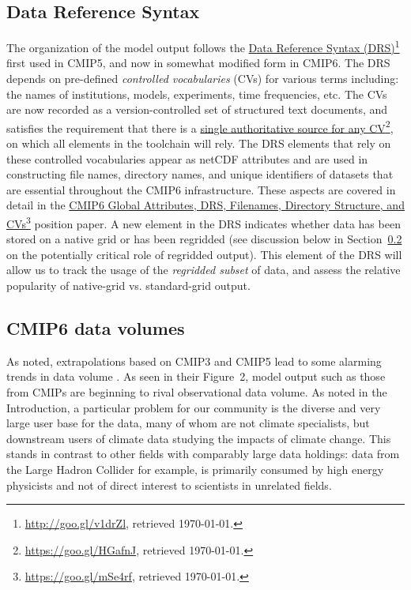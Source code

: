 \documentclass[gmd,manuscript]{copernicus}
\newcommand{\pllabel}[1]{\label{p-#1}\linelabel{l-#1}}
\newcommand{\urlref}[2] {\href{#1}{#2}\footnote{\url{#1}, retrieved \today.}}
\begin{document}
\subsection{Data Reference Syntax}
\label{sec:data-drs}

The organization of the model output follows the
\urlref{http://goo.gl/v1drZl}{Data Reference Syntax (DRS)} first used
in CMIP5, and now in somewhat modified form in CMIP6. The DRS depends
on pre-defined \emph{controlled vocabularies} (CVs) for various terms
including: the names of institutions, models, experiments, time
frequencies, etc. The CVs are now recorded as a version-controlled set
of structured text documents, and satisfies the requirement that there
is a \urlref{https://goo.gl/HGafnJ}{single authoritative source for
  any CV}, on which all elements in the toolchain will rely. The DRS
elements that rely on these controlled vocabularies appear as netCDF
attributes and are used in constructing file names, directory names,
and unique identifiers of datasets that are essential throughout the
CMIP6 infrastructure. These aspects are covered in detail in the
\urlref{https://goo.gl/mSe4rf}{CMIP6 Global Attributes, DRS,
  Filenames, Directory Structure, and CVs} position paper. A new
element in the DRS indicates whether data has been stored on a native
grid or has been regridded (see discussion below in
Section~\ref{sec:dvol} on the potentially critical role of regridded
output). This element of the DRS will allow us to track the usage of
the \emph{regridded subset} of data, and assess the relative
popularity of native-grid vs. standard-grid output.

\subsection{CMIP6 data volumes}
\label{sec:dvol}

As noted, extrapolations based on CMIP3 and CMIP5 lead to some
alarming trends in data volume \citep[see
e.g.,][]{ref:overpecketal2011}.
\pllabel{RC3-10}
As seen in their Figure~2, model output such as those from CMIPs are
beginning to rival observational data volume. As noted in the
Introduction, a particular problem for our community is the diverse
and very large user base for the data, many of whom are not climate
specialists, but downstream users of climate data studying the impacts
of climate change. This stands in contrast to other fields with
comparably large data holdings: data from the Large Hadron Collider
\citep[e.g.,][]{ref:aadetal2008} for example, is primarily consumed by
high energy physicists and not of direct interest to scientists in
unrelated fields.
\end{document}
